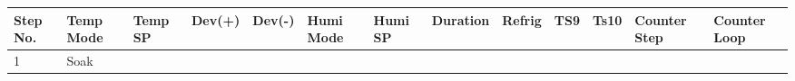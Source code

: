 \begin{longtable}[]{@{}lllllllllllll@{}}
\toprule
\begin{minipage}[b]{0.06\columnwidth}\raggedright
Step No.\strut
\end{minipage} & \begin{minipage}[b]{0.06\columnwidth}\raggedright
Temp Mode\strut
\end{minipage} & \begin{minipage}[b]{0.05\columnwidth}\raggedright
Temp SP\strut
\end{minipage} & \begin{minipage}[b]{0.04\columnwidth}\raggedright
Dev(+)\strut
\end{minipage} & \begin{minipage}[b]{0.04\columnwidth}\raggedright
Dev(-)\strut
\end{minipage} & \begin{minipage}[b]{0.06\columnwidth}\raggedright
Humi Mode\strut
\end{minipage} & \begin{minipage}[b]{0.05\columnwidth}\raggedright
Humi SP\strut
\end{minipage} & \begin{minipage}[b]{0.05\columnwidth}\raggedright
Duration\strut
\end{minipage} & \begin{minipage}[b]{0.04\columnwidth}\raggedright
Refrig\strut
\end{minipage} & \begin{minipage}[b]{0.03\columnwidth}\raggedright
TS9\strut
\end{minipage} & \begin{minipage}[b]{0.03\columnwidth}\raggedright
Ts10\strut
\end{minipage} & \begin{minipage}[b]{0.07\columnwidth}\raggedright
Counter Step\strut
\end{minipage} & \begin{minipage}[b]{0.08\columnwidth}\raggedright
Counter Loop\strut
\end{minipage}\tabularnewline
\midrule
\endhead
\begin{minipage}[t]{0.06\columnwidth}\raggedright
1\strut
\end{minipage} & \begin{minipage}[t]{0.06\columnwidth}\raggedright
Soak\strut
\end{minipage} & \begin{minipage}[t]{0.05\columnwidth}\raggedright

\end{minipage}
\end{longtable}
